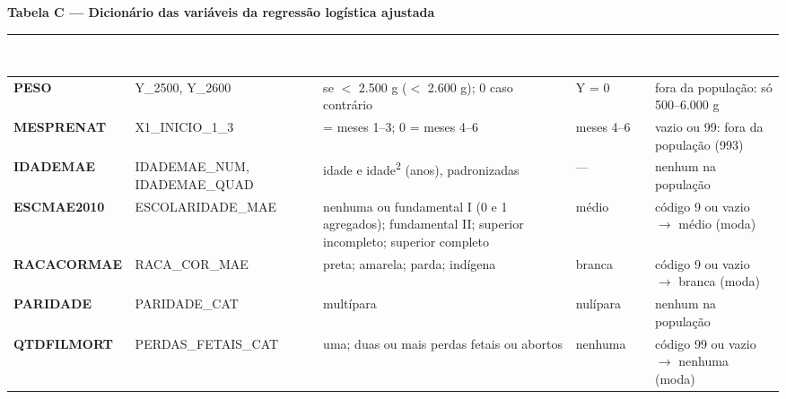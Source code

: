\documentclass[10pt,a4paper]{article}
\newcommand{\seta}{\ensuremath{\rightarrow}}
\newcommand{\menor}{\ensuremath{<}}
\begin{document}
\par\vspace{4pt}
{\footnotesize\bfseries\color{iptescuro} Tabela C --- Dicionário das variáveis da regressão logística ajustada\par}\vspace{2pt}
{\footnotesize\renewcommand{\arraystretch}{1.2}\setlength{\tabcolsep}{4pt}
\begin{tabular}{>{\raggedright\arraybackslash}p{} >{\raggedright\arraybackslash}p{} >{\raggedright\arraybackslash}p{} >{\raggedright\arraybackslash}p{} >{\raggedright\arraybackslash}p{}}
\rowcolor{iptazul}\textcolor{white}{\bfseries Variável SINASC} & \textcolor{white}{\bfseries Nome no modelo} & \textcolor{white}{\bfseries Codificação no modelo} & \textcolor{white}{\bfseries Referência} & \textcolor{white}{\bfseries Ignorados} \\ \hline
\textbf{PESO} & Y\_2500, Y\_2600 & 1 se \menor{} 2.500 g (\menor{} 2.600 g); 0 caso contrário & Y = 0 & fora da população: só 500--6.000 g \\ \hline
\textbf{MESPRENAT} & X1\_INICIO\_1\_3 & 1 = meses 1--3; 0 = meses 4--6 & meses 4--6 & vazio ou 99: fora da população (993) \\ \hline
\textbf{IDADEMAE} & IDADEMAE\_NUM, IDADEMAE\_QUAD & idade e idade\textsuperscript{2} (anos), padronizadas & --- & nenhum na população \\ \hline
\textbf{ESCMAE2010} & ESCOLARIDADE\_MAE & nenhuma ou fundamental I (0 e 1 agregados); fundamental II; superior incompleto; superior completo & médio & código 9 ou vazio \seta{} médio (moda) \\ \hline
\textbf{RACACORMAE} & RACA\_COR\_MAE & preta; amarela; parda; indígena & branca & código 9 ou vazio \seta{} branca (moda) \\ \hline
\textbf{PARIDADE} & PARIDADE\_CAT & multípara & nulípara & nenhum na população \\ \hline
\textbf{QTDFILMORT} & PERDAS\_FETAIS\_CAT & uma; duas ou mais perdas fetais ou abortos & nenhuma & código 99 ou vazio \seta{} nenhuma (moda) \\ \hline
\end{tabular}\par}\par{}\par\vspace{6pt}
\end{document}
